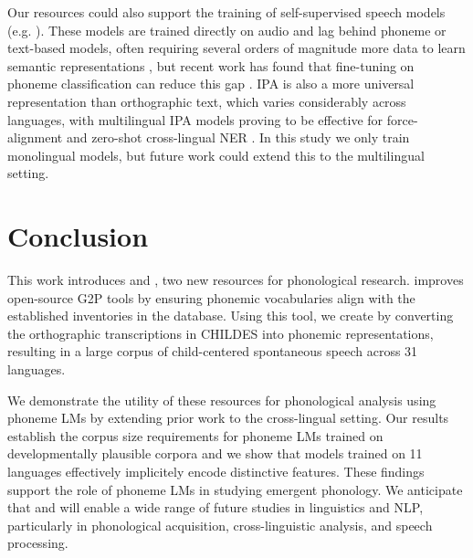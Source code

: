 Our resources could also support the training of self-supervised speech models (e.g. \citet{hsu2021hubert}). These models are trained directly on audio and lag behind phoneme or text-based models, often requiring several orders of magnitude more data to learn semantic representations \citep{cuervo2024scaling}, but recent work has found that fine-tuning on phoneme classification can reduce this gap \citep{feng-2023-language-universal-phonetic, poli2024improving}. IPA is also a more universal representation than orthographic text, which varies considerably across languages, with multilingual IPA models proving to be effective for force-alignment \citep{zhu-etal-2024-taste} and zero-shot cross-lingual NER \citep{sohn2024zero}. In this study we only train monolingual models, but future work could extend this to the multilingual setting.

\section{Conclusion}

This work introduces \corpusphonemizer and \ipachildes, two new resources for phonological research. \corpusphonemizer improves open-source G2P tools by ensuring phonemic vocabularies align with the established inventories in the \phoible database. Using this tool, we create \ipachildes by converting the orthographic transcriptions in CHILDES into phonemic representations, resulting in a large corpus of child-centered spontaneous speech across 31 languages.

We demonstrate the utility of these resources for phonological analysis using phoneme LMs by extending prior work to the cross-lingual setting. Our results establish the corpus size requirements for phoneme LMs trained on developmentally plausible corpora and we show that models trained on 11 languages effectively implicitely encode distinctive features. These findings support the role of phoneme LMs in studying emergent phonology. We anticipate that \corpusphonemizer and \ipachildes will enable a wide range of future studies in linguistics and NLP, particularly in phonological acquisition, cross-linguistic analysis, and speech processing.




